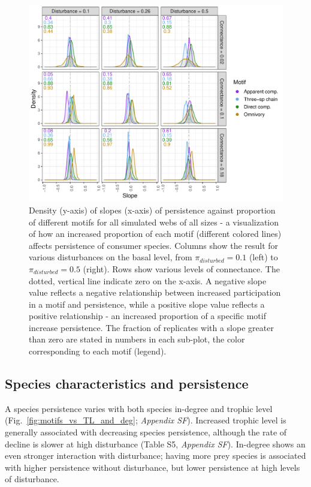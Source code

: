 \documentclass[12pt]{article}
\begin{document}
\begin{spacing}{2.0}
        \begin{figure}[h!]
            \centering
            \includegraphics[width=\textwidth]{figures/prop_dens_bp_vs_C_allS.pdf}
            \caption{Density (y-axis) of slopes (x-axis) of persistence against proportion of different motifs for all simulated webs of all sizes - a visualization of how an increased proportion of each motif (different colored lines) affects persistence of consumer species. Columns show the result for various disturbances on the basal level, from $\pi_{disturbed} = 0.1$ (left) to $\pi_{disturbed} = 0.5$ (right). Rows show various levels of connectance. The dotted, vertical line indicate zero on the x-axis. A negative slope value reflects a negative relationship between increased participation in a motif and persistence, while a positive slope value reflects a positive relationship - an increased proportion of a specific motif increase persistence. The fraction of replicates with a slope greater than zero are stated in numbers in each sub-plot, the color corresponding to each motif (legend). }
            \label{fig:density_prop_C}
        \end{figure}    
    
    \subsection*{Species characteristics and persistence}
    
        A species persistence varies with both species in-degree and trophic level (Fig.~\ref{fig:motifs_vs_TL_and_deg}; \emph{Appendix SF}). Increased trophic level is generally associated with decreasing species persistence, although the rate of decline is slower at high disturbance (Table S5, \emph{Appendix SF}).
        In-degree shows an even stronger interaction with disturbance; having more prey species is associated with higher persistence without disturbance, but lower persistence at high levels of disturbance.


\end{spacing}
\end{document}
